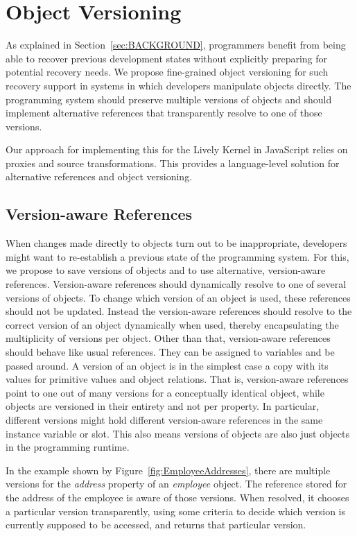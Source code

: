 \chapter{Object Versioning} \label{chapter:APPROACH}

As explained in Section~\ref{sec:BACKGROUND}, programmers benefit from being able to recover previous development states without explicitly preparing for potential recovery needs.
We propose fine-grained object versioning for such recovery support in systems in which developers manipulate objects directly.
The programming system should preserve multiple versions of objects and should implement alternative references that transparently resolve to one of those versions.

Our approach for implementing this for the Lively Kernel in JavaScript relies on proxies and source transformations.
This provides a language-level solution for alternative references and object versioning.


\section{Version-aware References} \label{sec:APPROACH:1}

When changes made directly to objects turn out to be inappropriate, developers might want to re-establish a previous state of the programming system.
For this, we propose to save versions of objects and to use alternative, version-aware references.
Version-aware references should dynamically resolve to one of several versions of objects.
To change which version of an object is used, these references should not be updated.
Instead the version-aware references should resolve to the correct version of an object dynamically when used, thereby encapsulating the multiplicity of versions per object.
Other than that, version-aware references should behave like usual references.
They can be assigned to variables and be passed around.
A version of an object is in the simplest case a copy with its values for primitive values and object relations.
That is, version-aware references point to one out of many versions for a conceptually identical object, while objects are versioned in their entirety and not per property.
In particular, different versions might hold different version-aware references in the same instance variable or slot.
This also means versions of objects are also just objects in the programming runtime.

In the example shown by Figure~\ref{fig:EmployeeAddresses}, there are multiple versions for the \emph{address} property of an \emph{employee} object.
The reference stored for the address of the employee is aware of those versions.
When resolved, it chooses a particular version transparently, using some criteria to decide which version is currently supposed to be accessed, and returns that particular version.

